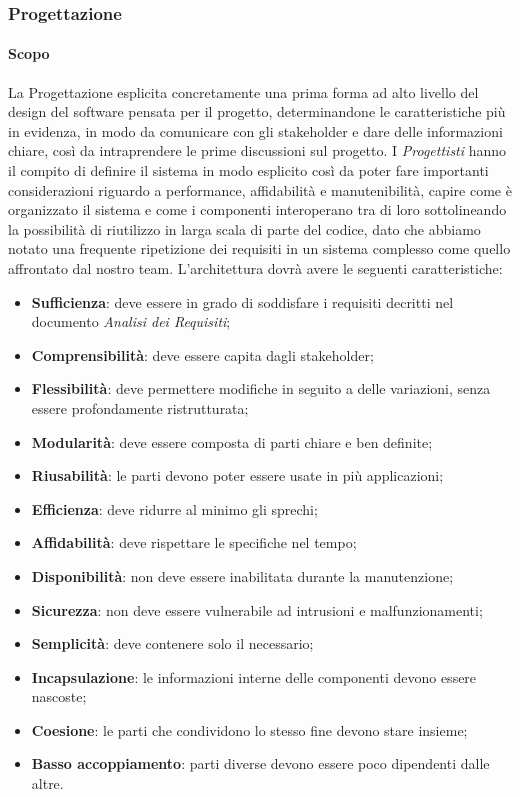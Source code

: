 \subsubsection{Progettazione}
\paragraph{Scopo}\Spazio
La Progettazione esplicita concretamente una prima forma ad alto livello del design del software pensata per il progetto, determinandone le caratteristiche più in evidenza, in modo da comunicare con gli stakeholder e dare delle informazioni chiare, così da intraprendere le prime discussioni sul progetto. I \emph{Progettisti} hanno il compito di definire il sistema in modo esplicito così da poter fare importanti considerazioni riguardo a performance, affidabilità e manutenibilità, capire come è organizzato il sistema  e come i componenti interoperano tra di loro sottolineando la possibilità di riutilizzo in larga scala di parte del codice, dato che abbiamo notato una frequente ripetizione dei requisiti in un sistema complesso come quello affrontato dal nostro team.
L’architettura dovrà avere le seguenti caratteristiche:
	\begin{itemize}
		\item \textbf{Sufficienza}: deve essere in grado di soddisfare i requisiti decritti nel documento \emph{Analisi dei Requisiti};
		\item \textbf{Comprensibilità}: deve essere capita dagli stakeholder;
		\item \textbf{Flessibilità}: deve permettere modifiche in seguito a delle variazioni, senza essere profondamente ristrutturata;
		\item \textbf{Modularità}: deve essere composta di parti chiare e ben definite;
		\item \textbf{Riusabilità}: le parti devono poter essere usate in più applicazioni;
		\item \textbf{Efficienza}: deve ridurre al minimo gli sprechi;
		\item \textbf{Affidabilità}: deve rispettare le specifiche nel tempo;
		\item \textbf{Disponibilità}: non deve essere inabilitata durante la manutenzione;
		\item \textbf{Sicurezza}: non deve essere vulnerabile ad intrusioni e malfunzionamenti;
		\item \textbf{Semplicità}: deve contenere solo il necessario;
		\item \textbf{Incapsulazione}: le informazioni interne delle componenti devono essere nascoste;
		\item \textbf{Coesione}: le parti che condividono lo stesso fine devono stare insieme;
		\item \textbf{Basso accoppiamento}: parti diverse devono essere poco dipendenti dalle altre.
	\end{itemize}

